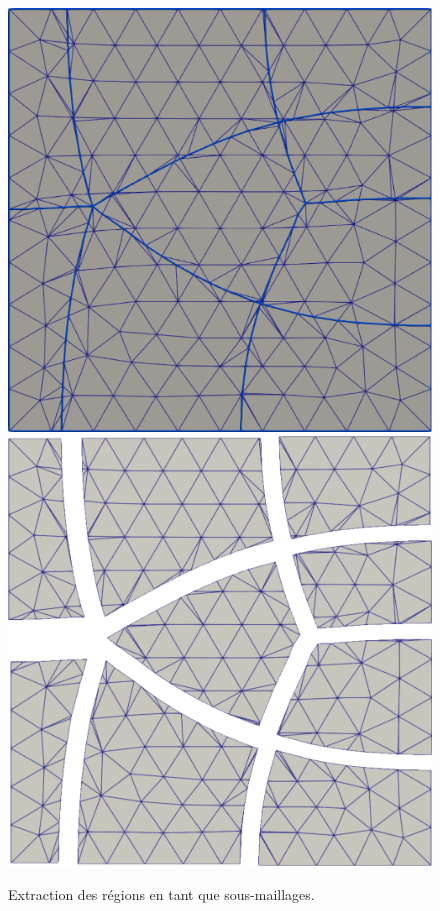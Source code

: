 \begin{figure}[h!]
\centering
\includegraphics[scale=0.29]{images/eclatement_2.pdf}
\hfill
\includegraphics[scale=0.352]{images/eclatement_3.pdf}
\caption{Extraction des régions en tant que sous-maillages.}
\label{fig:eclatement}
\end{figure}

